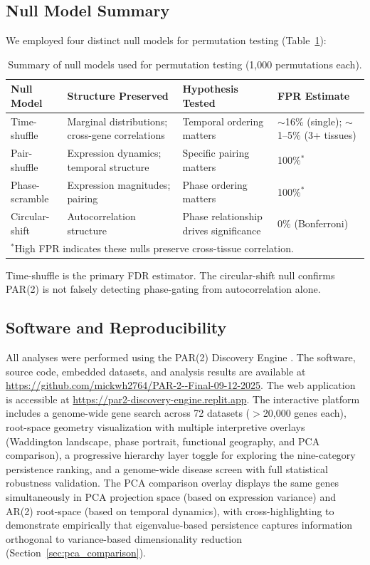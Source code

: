 \documentclass[11pt,letterpaper]{article}
\begin{document}
\subsection{Null Model Summary}

We employed four distinct null models for permutation testing (Table~\ref{tab:null_summary}):

\begin{table}[H]
\centering
\caption{Summary of null models used for permutation testing (1,000 permutations each).}
\label{tab:null_summary}
\begin{tabular}{p{2.5cm}p{3.5cm}p{4cm}p{2.5cm}}
\toprule
Null Model & Structure Preserved & Hypothesis Tested & FPR Estimate \\
\midrule
Time-shuffle & Marginal distributions; cross-gene correlations & Temporal ordering matters & $\sim$16\% (single); $\sim$1--5\% (3+ tissues) \\
Pair-shuffle & Expression dynamics; temporal structure & Specific pairing matters & 100\%$^*$ \\
Phase-scramble & Expression magnitudes; pairing & Phase ordering matters & 100\%$^*$ \\
Circular-shift & Autocorrelation structure & Phase relationship drives significance & 0\% (Bonferroni) \\
\bottomrule
\multicolumn{4}{l}{\small $^*$High FPR indicates these nulls preserve cross-tissue correlation.} \\
\end{tabular}
\end{table}

Time-shuffle is the primary FDR estimator. The circular-shift null confirms PAR(2) is not falsely detecting phase-gating from autocorrelation alone.

\subsection{Software and Reproducibility}

All analyses were performed using the PAR(2) Discovery Engine \citep{whiteside2026zenodo}. The software, source code, embedded datasets, and analysis results are available at \url{https://github.com/mickwh2764/PAR-2--Final-09-12-2025}. The web application is accessible at \url{https://par2-discovery-engine.replit.app}. The interactive platform includes a genome-wide gene search across 72 datasets ($>$20,000 genes each), root-space geometry visualization with multiple interpretive overlays (Waddington landscape, phase portrait, functional geography, and PCA comparison), a progressive hierarchy layer toggle for exploring the nine-category persistence ranking, and a genome-wide disease screen with full statistical robustness validation. The PCA comparison overlay displays the same genes simultaneously in PCA projection space (based on expression variance) and AR(2) root-space (based on temporal dynamics), with cross-highlighting to demonstrate empirically that eigenvalue-based persistence captures information orthogonal to variance-based dimensionality reduction (Section~\ref{sec:pca_comparison}).
\end{document}
